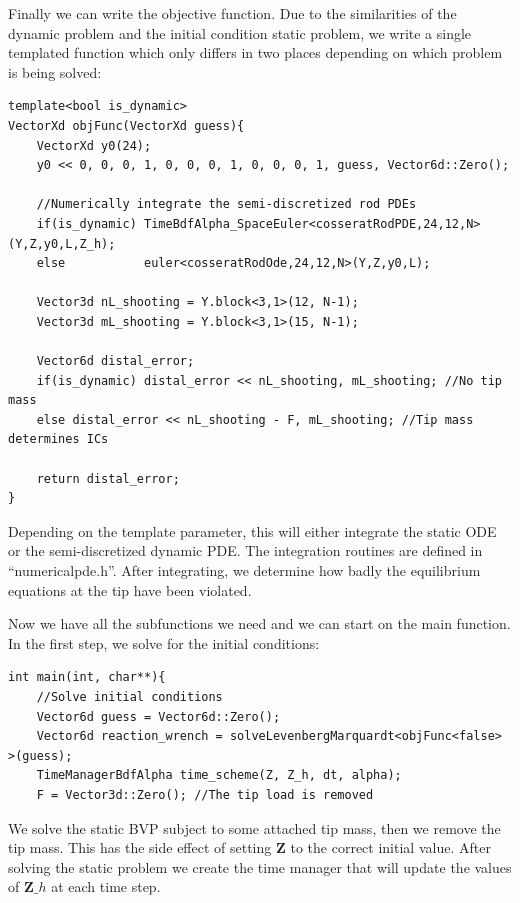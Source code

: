 \documentclass[12pt]{article}
\begin{document}
Finally we can write the objective function. Due to the similarities of the dynamic problem and the initial condition static problem, we write a single templated function which only differs in two places depending on which problem is being solved:

\begin{lstlisting}
template<bool is_dynamic>
VectorXd objFunc(VectorXd guess){
    VectorXd y0(24);
    y0 << 0, 0, 0, 1, 0, 0, 0, 1, 0, 0, 0, 1, guess, Vector6d::Zero();

    //Numerically integrate the semi-discretized rod PDEs
    if(is_dynamic) TimeBdfAlpha_SpaceEuler<cosseratRodPDE,24,12,N>(Y,Z,y0,L,Z_h);
    else           euler<cosseratRodOde,24,12,N>(Y,Z,y0,L);

    Vector3d nL_shooting = Y.block<3,1>(12, N-1);
    Vector3d mL_shooting = Y.block<3,1>(15, N-1);

    Vector6d distal_error;
    if(is_dynamic) distal_error << nL_shooting, mL_shooting; //No tip mass
    else distal_error << nL_shooting - F, mL_shooting; //Tip mass determines ICs

    return distal_error;
}
\end{lstlisting}
Depending on the template parameter, this will either integrate the static ODE or the semi-discretized dynamic PDE. The integration routines are defined in ``numericalpde.h''. After integrating, we determine how badly the equilibrium equations at the tip have been violated.

Now we have all the subfunctions we need and we can start on the main function. In the first step, we solve for the initial conditions:
\begin{lstlisting}
int main(int, char**){
    //Solve initial conditions
    Vector6d guess = Vector6d::Zero();
    Vector6d reaction_wrench = solveLevenbergMarquardt<objFunc<false> >(guess);
    TimeManagerBdfAlpha time_scheme(Z, Z_h, dt, alpha);
    F = Vector3d::Zero(); //The tip load is removed
\end{lstlisting}
We solve the static BVP subject to some attached tip mass, then we remove the tip mass. This has the side effect of setting $\boldsymbol{Z}$ to the correct initial value. After solving the static problem we create the time manager that will update the values of $\boldsymbol{Z}\_h$ at each time step.
\end{document}
